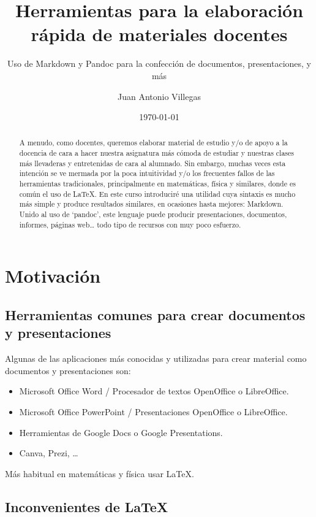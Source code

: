 \documentclass[
  spanish,
]{article}
\title{Herramientas para la elaboración rápida de materiales docentes}
\subtitle{Uso de Markdown y Pandoc para la confección de documentos,
presentaciones, y más}
\author{Juan Antonio Villegas}
\date{\today}
\providecommand{\tightlist}{%
  \setlength{\itemsep}{0pt}\setlength{\parskip}{0pt}}
\begin{document}
\maketitle
\begin{abstract}
A menudo, como docentes, queremos elaborar material de estudio y/o de
apoyo a la docencia de cara a hacer nuestra asignatura más cómoda de
estudiar y nuestras clases más llevaderas y entretenidas de cara al
alumnado. Sin embargo, muchas veces esta intención se ve mermada por la
poca intuitividad y/o los frecuentes fallos de las herramientas
tradicionales, principalmente en matemáticas, física y similares, donde
es común el uso de LaTeX. En este curso introduciré una utilidad cuya
sintaxis es mucho más simple y produce resultados similares, en
ocasiones hasta mejores: Markdown. Unido al uso de `pandoc', este
lenguaje puede producir presentaciones, documentos, informes, páginas
web\ldots{} todo tipo de recursos con muy poco esfuerzo.
\end{abstract}

\section{Motivación}\label{motivaciuxf3n}

\subsection{Herramientas comunes para crear documentos y
presentaciones}\label{herramientas-comunes-para-crear-documentos-y-presentaciones}

Algunas de las aplicaciones más conocidas y utilizadas para crear
material como documentos y presentaciones son:

\begin{itemize}
\tightlist
\item
  Microsoft Office Word / Procesador de textos OpenOffice o LibreOffice.
\item
  Microsoft Office PowerPoint / Presentaciones OpenOffice o LibreOffice.
\item
  Herramientas de Google Docs o Google Presentations.
\item
  Canva, Prezi, \ldots{}
\end{itemize}

Más habitual en matemáticas y física usar \LaTeX.

\subsection{\texorpdfstring{Inconvenientes de
\LaTeX}{Inconvenientes de }}\label{inconvenientes-de}
\end{document}
